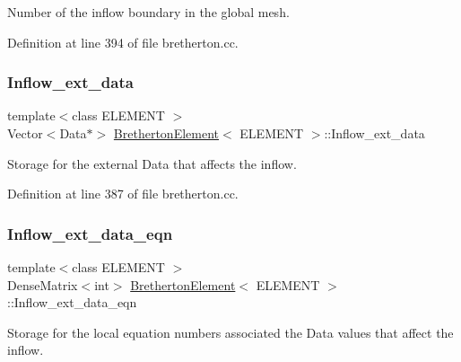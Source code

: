 Number of the inflow boundary in the global mesh. 



Definition at line 394 of file bretherton.\+cc.

\mbox{\label{classBrethertonElement_a84c7822cf2a97fe45e936429faa16788}} 
\subsubsection{\texorpdfstring{Inflow\+\_\+ext\+\_\+data}{Inflow\_ext\_data}}
{\footnotesize\ttfamily template$<$class E\+L\+E\+M\+E\+NT $>$ \\
Vector$<$Data$\ast$$>$ \hyperlink{classBrethertonElement}{Bretherton\+Element}$<$ E\+L\+E\+M\+E\+NT $>$\+::Inflow\+\_\+ext\+\_\+data\hspace{0.3cm}{\ttfamily [private]}}



Storage for the external Data that affects the inflow. 



Definition at line 387 of file bretherton.\+cc.

\mbox{\label{classBrethertonElement_ad1ddf8c7a6fd590bf7156d13640303d1}} 
\subsubsection{\texorpdfstring{Inflow\+\_\+ext\+\_\+data\+\_\+eqn}{Inflow\_ext\_data\_eqn}}
{\footnotesize\ttfamily template$<$class E\+L\+E\+M\+E\+NT $>$ \\
Dense\+Matrix$<$int$>$ \hyperlink{classBrethertonElement}{Bretherton\+Element}$<$ E\+L\+E\+M\+E\+NT $>$\+::Inflow\+\_\+ext\+\_\+data\+\_\+eqn\hspace{0.3cm}{\ttfamily [private]}}



Storage for the local equation numbers associated the Data values that affect the inflow. 



